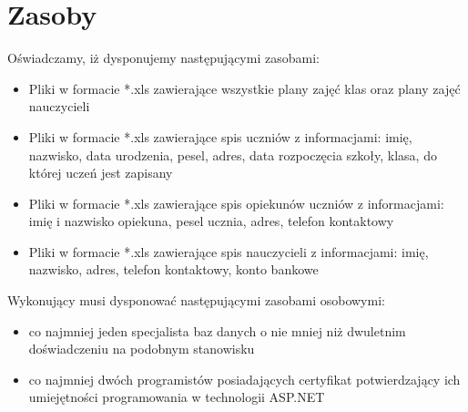 \documentclass{article}
\begin{document}
\section{Zasoby}
Oświadczamy, iż dysponujemy następującymi zasobami:
\begin{itemize}
    \item Pliki w formacie *.xls zawierające wszystkie plany zajęć klas oraz plany zajęć nauczycieli
    \item Pliki w formacie *.xls zawierające spis uczniów z informacjami: imię, nazwisko, data urodzenia, pesel, adres, data rozpoczęcia szkoły, klasa, do której uczeń jest zapisany
    \item Pliki w formacie *.xls zawierające spis opiekunów uczniów z informacjami: imię i nazwisko opiekuna, pesel ucznia, adres, telefon kontaktowy
    \item Pliki w formacie *.xls zawierające spis nauczycieli z informacjami: imię, nazwisko, adres, telefon kontaktowy, konto bankowe %
\end{itemize}

Wykonujący musi dysponować następującymi zasobami osobowymi:
\begin{itemize}
    \item co najmniej jeden specjalista baz danych o nie mniej niż dwuletnim doświadczeniu na podobnym stanowisku
    \item co najmniej dwóch programistów posiadających certyfikat potwierdzający ich umiejętności programowania w technologii ASP.NET %
\end{itemize}
\end{document}
